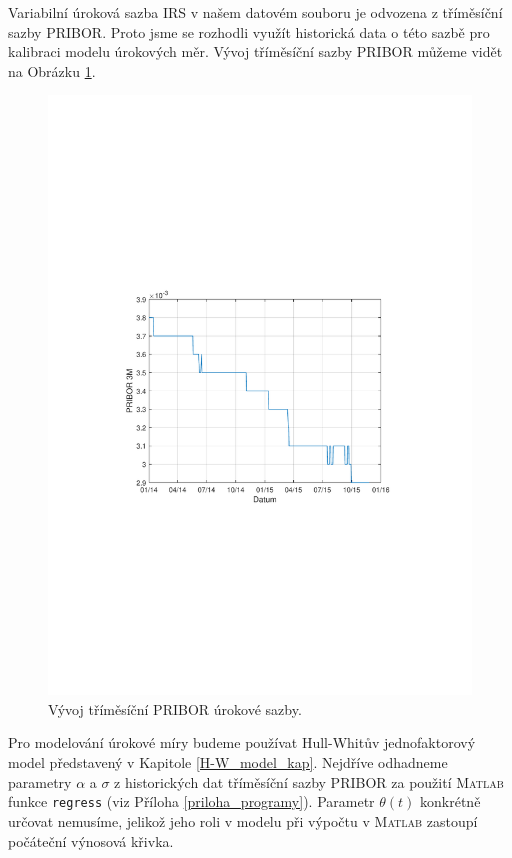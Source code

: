 \documentclass[a4paper,12pt]{report}
\theoremstyle{definition} \newtheorem{definice}[veta]{Definice}
\theoremstyle{remark}
\newcommand{\MATLAB}{\textsc{Matlab}\xspace}
\begin{document}

Variabilní úroková sazba IRS v našem datovém souboru je odvozena z tříměsíční sazby PRIBOR.
Proto jsme se rozhodli využít historická data o této sazbě pro kalibraci modelu úrokových měr.
Vývoj tříměsíční sazby PRIBOR můžeme vidět na Obrázku \ref{PRIBOR}.

\begin{figure}[!htbp]
  \centering 
	\includegraphics[width=13cm, clip, trim= 110 260 110 270]{IMG/PRIBOR_cz.pdf}
  \caption{Vývoj tříměsíční PRIBOR úrokové sazby.}  \label{PRIBOR}
\end{figure}

Pro modelování úrokové míry budeme používat Hull-Whitův jednofaktorový model představený v Kapitole \ref{H-W_model_kap}.
Nejdříve odhadneme parametry $\alpha$ a $\sigma$ z historických dat tříměsíční sazby PRIBOR za použití \MATLAB funkce \verb+regress+ (viz Příloha \ref{priloha_programy}).
Parametr $\theta(t)$ konkrétně určovat nemusíme, jelikož jeho roli v modelu při výpočtu v \MATLAB zastoupí počáteční výnosová křivka.
\end{document}
